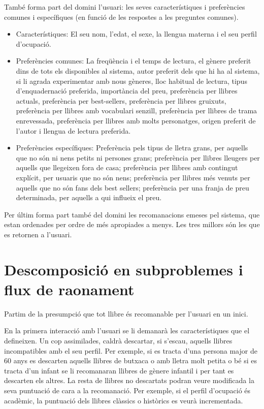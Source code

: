 També forma part del domini l'usuari: les seves característiques i preferències comunes i específiques (en funció de les respostes a les preguntes comunes).
\begin{itemize}
  \item Característiques: El seu nom, l'edat, el sexe, la llengua materna i el seu perfil d'ocupació.
  \item Preferències comunes: La freqüència i el temps de lectura, el gènere preferit dins de tots els disponibles al sistema, autor preferit dels que hi ha al sistema,  si li agrada experimentar amb nous gèneres, lloc habitual de lectura, tipus d'enquadernació preferida, importància del preu, preferència per llibres actuals, preferència per best-sellers, preferència per llibres gruixuts, preferència per llibres amb vocabulari senzill, preferència per llibres de trama enrevessada, preferència per llibres amb molts personatges, origen preferit de l'autor i llengua de lectura preferida.
  \item Preferències específiques: Preferència pels tipus de lletra grans, per aquells que no són ni nens petits ni persones grans; preferència per llibres lleugers per aquells que llegeixen fora de casa; preferència per llibres amb contingut explícit, per usuaris que no són nens; preferència per llibres més venuts per aquells que no són fans dels best sellers; preferència per una franja de preu determinada, per aquells a qui influeix el preu.
\end{itemize}

Per últim forma part també del domini les recomanacions emeses pel sistema, que estan ordenades per ordre de més apropiades a menys. Les tres millors són les que es retornen a l'usuari.

\section{Descomposició en subproblemes i flux de raonament}

Partim de la presumpció que tot llibre és recomanable per l'usuari en un inici. 

En la primera interacció amb l'usuari se li demanarà les característiques que el defineixen. Un cop assimilades, caldrà descartar, si s'escau, aquells llibres incompatibles amb el seu perfil. Per exemple, si es tracta d'una persona major de 60 anys es descarten aquells llibres de butxaca o amb lletra molt petita o bé si es tracta d'un infant se li recomanaran llibres de gènere infantil i per tant es descarten els altres. La resta de llibres no descartats podran veure modificada la seva puntuació de cara a la recomanació. Per exemple, si el perfil d'ocupació és acadèmic, la puntuació dels llibres clàssics o històrics es veurà incrementada.

